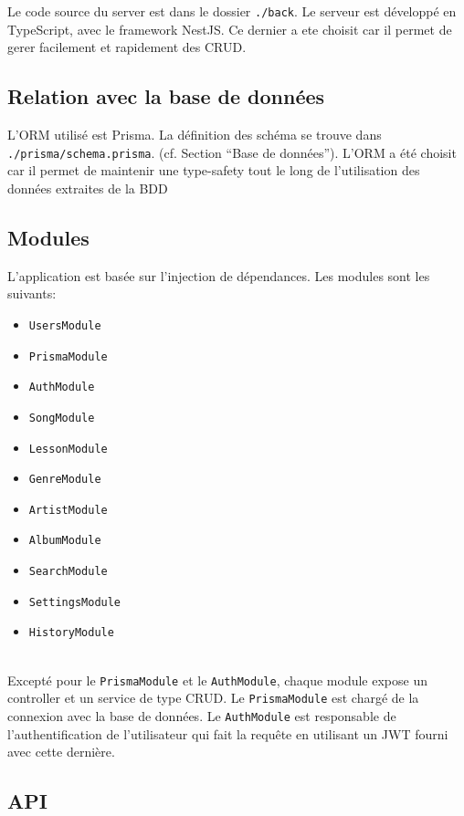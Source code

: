 Le code source du server est dans le dossier \texttt{./back}. Le serveur est développé en TypeScript, avec le framework NestJS. Ce dernier a ete choisit car il permet de gerer facilement et rapidement des CRUD.

\subsection*{Relation avec la base de données}
L’ORM utilisé est Prisma. La définition des schéma se trouve dans \texttt{./prisma/schema.prisma}. (cf. Section “Base de données”). L'ORM a été choisit car il permet de maintenir une type-safety tout le long de l'utilisation des données extraites de la BDD

\subsection*{Modules}
L’application est basée sur l'injection de dépendances. Les modules sont les suivants:

\begin{itemize}
	\item \texttt{UsersModule}
	\item \texttt{PrismaModule}
	\item \texttt{AuthModule}
	\item \texttt{SongModule}
	\item \texttt{LessonModule}
	\item \texttt{GenreModule}
	\item \texttt{ArtistModule}
	\item \texttt{AlbumModule}
	\item \texttt{SearchModule}
	\item \texttt{SettingsModule}
	\item \texttt{HistoryModule}
\end{itemize}
\  \\ %
Excepté pour le \texttt{PrismaModule} et le \texttt{AuthModule}, chaque module expose un controller et un service de type CRUD.
Le \texttt{PrismaModule} est chargé de la connexion avec la base de données. Le \texttt{AuthModule} est responsable de l'authentification de l’utilisateur qui fait la requête en utilisant un JWT fourni avec cette dernière.

\subsection*{API}

